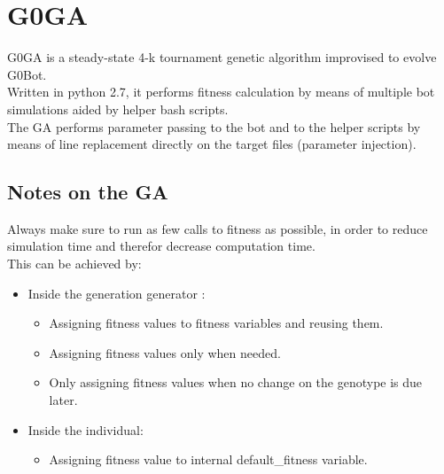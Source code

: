 \documentclass[12pt]{report}
\begin{document}
		\section{G0GA}
		G0GA is a steady-state 4-k tournament genetic algorithm improvised to evolve G0Bot.\\
		Written in python 2.7, it performs fitness calculation by means of multiple bot simulations aided by helper bash scripts.\\
		The GA performs parameter passing to the bot and to the helper scripts by means of line replacement directly on the target files (parameter injection).\\
		\subsection{Notes on the GA}
		Always make sure to run as few calls to fitness as possible, in order to reduce simulation time and therefor decrease computation time.\\
		This can be achieved by:\\
			\begin{itemize}
				\item Inside the generation generator	: 
				\begin{itemize}
					\item Assigning fitness values to fitness variables and reusing them.
					\item Assigning fitness values only when needed.
					\item Only assigning fitness values when no change on the genotype is due later.
				\end{itemize}
				\item Inside the individual: 
				\begin{itemize}
					\item Assigning fitness value to internal default\_fitness variable.
				\end{itemize}
			\end{itemize}
	
	\newpage
\end{document}

